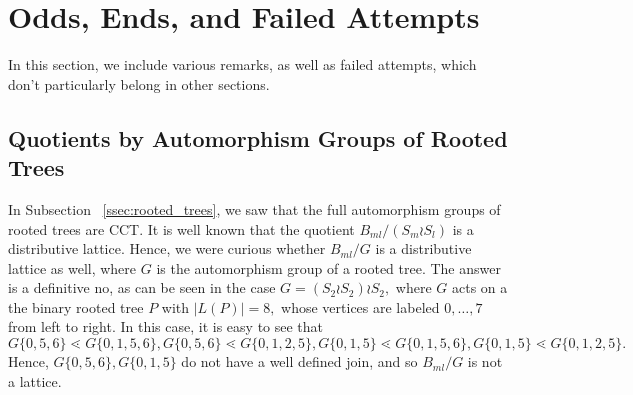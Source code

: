 \documentclass[10 pt]{amsart}
\theoremstyle{plain}
\theoremstyle{definition}
\theoremstyle{remark}
\numberwithin{equation}{section}
\newcommand\ssec{\subsection}
\begin{document}
\section{Odds, Ends, and Failed Attempts}

In this section, we include various remarks, as well as failed attempts, which don't particularly belong in other sections.

\ssec{Quotients by Automorphism Groups of Rooted Trees}

In Subsection ~\ref{ssec:rooted_trees}, we saw that the full automorphism groups of rooted trees are CCT. It is well known that the quotient $B_{ml}/(S_m\wr S_l)$ is a distributive lattice. Hence, we were curious whether $B_{ml}/G$ is a distributive lattice as well, where $G$ is the automorphism group of a rooted tree. The answer is a definitive no, as can be seen in the case $G = (S_2 \wr S_2) \wr S_2,$ where $G$ acts on a the binary rooted tree $P$ with $|L(P)| = 8,$ whose vertices are labeled $0,\ldots, 7$ from left to right. In this case, it is easy to see that $G\{0,5,6\} \lessdot G\{0,1,5,6\},G\{0,5,6\} \lessdot G\{0,1,2,5\},G\{0,1,5\} \lessdot G\{0,1,5,6\},G\{0,1,5\} \lessdot G\{0,1,2,5\}.$ Hence, $G\{0,5,6\},G\{0,1,5\}$ do not have a well defined join, and so $B_{ml}/G$ is not a lattice.

\begin{figure}
\caption{}
\end{figure}
\end{document}

